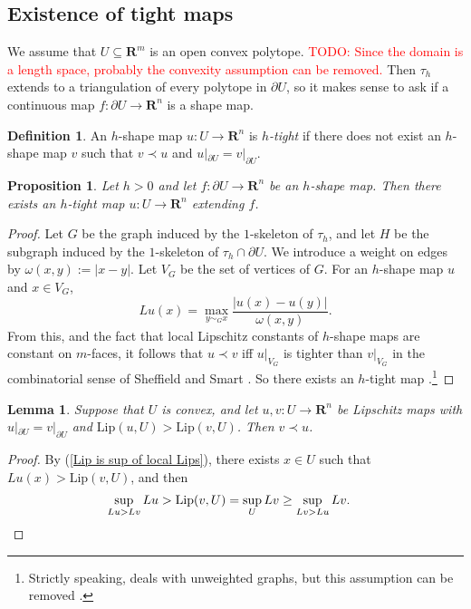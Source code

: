 \documentclass[reqno,11pt]{amsart}
\newcommand{\RR}{\mathbf{R}}
\newcommand{\Lip}{\mathrm{Lip}}
\newcommand{\dfn}[1]{\emph{#1}\index{#1}}
\newtheorem{lemma}[theorem]{Lemma}
\newtheorem{proposition}[theorem]{Proposition}
\theoremstyle{definition}
\newtheorem{definition}[theorem]{Definition}
\numberwithin{equation}{section}
\newcommand\todo[1]{\textcolor{red}{TODO: #1}}
\begin{document}
\subsection{Existence of tight maps}
We assume that $U \subseteq \RR^m$ is an open convex polytope.
\todo{Since the domain is a length space, probably the convexity assumption can be removed.}
Then $\tau_h$ extends to a triangulation of every polytope in $\partial U$, so it makes sense to ask if a continuous map $f: \partial U \to \RR^n$ is a shape map.

\begin{definition}
An $h$-shape map $u: U \to \RR^n$ is \dfn{$h$-tight} if there does not exist an $h$-shape map $v$ such that $v \prec u$ and $u|_{\partial U} = v|_{\partial U}$.
\end{definition}

\begin{proposition}\label{discrete wellposedness}
Let $h > 0$ and let $f: \partial U \to \RR^n$ be an $h$-shape map.
Then there exists an $h$-tight map $u: U \to \RR^n$ extending $f$.
\end{proposition}
\begin{proof}
Let $G$ be the graph induced by the $1$-skeleton of $\tau_h$, and let $H$ be the subgraph induced by the $1$-skeleton of $\tau_h \cap \partial U$.
We introduce a weight on edges by $\omega(x, y) := |x - y|$.
Let $V_G$ be the set of vertices of $G$.
For an $h$-shape map $u$ and $x \in V_G$,
$$Lu(x) = \max_{y \sim_G x} \frac{|u(x) - u(y)|}{\omega(x, y)}.$$
From this, and the fact that local Lipschitz constants of $h$-shape maps are constant on $m$-faces, it follows that $u \prec v$ iff $u|_{V_G}$ is tighter than $v|_{V_G}$ in the combinatorial sense of Sheffield and Smart \cite[\S1.2]{Sheffield12}.
So there exists an $h$-tight map \cite[Theorem 1.2]{Sheffield12}.\footnote{Strictly speaking, \cite{Sheffield12} deals with unweighted graphs, but this assumption can be removed \cite[Remark 2.2]{Sheffield12}.}
\end{proof}

\begin{lemma}\label{tight implies best lipschitz}
Suppose that $U$ is convex, and let $u, v: U \to \RR^n$ be Lipschitz maps with $u|_{\partial U} = v|_{\partial U}$ and $\Lip(u, U) > \Lip(v, U)$.
Then $v \prec u$.
\end{lemma}
\begin{proof}
By (\ref{Lip is sup of local Lips}), there exists $x \in U$ such that $Lu(x) > \Lip(v, U)$, and then
\begin{align*}
\sup_{Lu > Lv} Lu &> \Lip(v, U) = \sup_U Lv \geq \sup_{Lv > Lu} Lv. \qedhere
\end{align*}
\end{proof}
\end{document}
